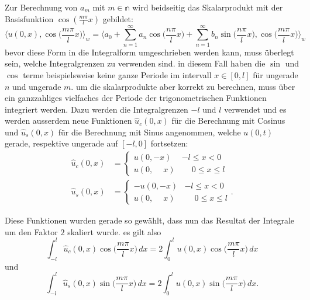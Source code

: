 Zur Berechnung von $a_m$ mit $ m \in \mathbb{n} $ wird beidseitig das
Skalarprodukt mit der Basisfunktion $ \cos(\frac{m \pi}{l}x)$
gebildet:
\begin{equation}
    \label{sturmliouville:eq:dot-product-cosine}
    \biggl\langle u(0, x), \cos\biggl(\frac{m \pi}{l}x\biggr) \biggr\rangle _w
    =
    \biggl\langle a_0
    +
    \sum_{n = 1}^{\infty} a_n\cos\biggl(\frac{n\pi}{l}x\biggr)
    +
    \sum_{n = 1}^{\infty} b_n\sin\biggl(\frac{n\pi}{l}x\biggr),
    \cos\biggl(\frac{m \pi}{l}x\biggr)\biggr\rangle _w
\end{equation}
bevor diese Form in die Integralform umgeschrieben werden kann, muss überlegt
sein, welche Integralgrenzen zu verwenden sind.
in diesem Fall haben die $\sin$ und $\cos$ terme beispielsweise keine ganze
Periode im intervall $x \in [0, l]$ für ungerade $n$ und ungerade $m$.
um die skalarprodukte aber korrekt zu berechnen, muss über ein ganzzahliges
vielfaches der Periode der trigonometrischen Funktionen integriert werden.
Dazu werden die Integralgrenzen $-l$ und $l$ verwendet und es werden ausserdem
neue Funktionen $\hat{u}_c(0, x)$ für die Berechnung mit Cosinus und
$\hat{u}_s(0, x)$ für die Berechnung mit Sinus angenommen, welche $u(0, t)$
gerade, respektive ungerade auf $[-l, 0]$ fortsetzen:
\[
\begin{aligned}
    \hat{u}_c(0, x)
    &=
    \begin{cases}
        u(0, -x) & -l \leq x < 0
        \\
        u(0, \phantom{-}x) & \phantom{-}0 \leq x \leq l
    \end{cases}
    \\
    \hat{u}_s(0, x)
    &=
    \begin{cases}
        -u(0, -x) & -l \leq x < 0
        \\
        u(0, \phantom{-}x) & \phantom{-}0 \leq x \leq l
    \end{cases}.
\end{aligned}
\]

Diese Funktionen wurden gerade so gewählt, dass nun das Resultat der Integrale
um den Faktor $2$ skaliert wurde.
es gilt also
\[
    \int_{-l}^{l}\hat{u}_c(0, x)\cos\biggl(\frac{m \pi}{l}x\biggr)\,dx
    =
    2\int_{0}^{l}u(0, x)\cos\biggl(\frac{m \pi}{l}x\biggr)\,dx
\]
und
\[
    \int_{-l}^{l}\hat{u}_s(0, x)\sin\biggl(\frac{m \pi}{l}x\biggr)\,dx
    =
    2\int_{0}^{l}u(0, x)\sin\biggl(\frac{m \pi}{l}x\biggr)\,dx.
\]


